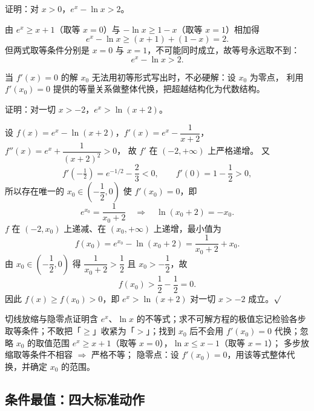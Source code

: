 \begin{explore}
\begin{example}
证明：对 $x>0$，$e^x-\ln x>2$。
\end{example}
\begin{solution}
由 $e^x\ge x+1$（取等 $x=0$）与 $-\ln x\ge1-x$（取等 $x=1$）相加得
\[
  e^x-\ln x\ge (x+1)+(1-x)=2 .
\]
但两式取等条件分别是 $x=0$ 与 $x=1$，不可能同时成立，故等号永远取不到：
\[
  e^x-\ln x>2 .
\]
\end{solution}

当 $f'(x)=0$ 的解 $x_0$ 无法用初等形式写出时，不必硬解：设 $x_0$ 为零点，
利用 $f'(x_0)=0$ 提供的等量关系做整体代换，把超越结构化为代数结构。

\begin{example}
证明：对一切 $x>-2$，$e^x>\ln(x+2)$。
\end{example}
\begin{solution}
设 $f(x)=e^x-\ln(x+2)$，$f'(x)=e^x-\dfrac1{x+2}$，$f''(x)=e^x+\dfrac1{(x+2)^2}>0$，
故 $f'$ 在 $(-2,+\infty)$ 上严格递增。
又
\[
  f'\!\left(-\tfrac12\right)=e^{-1/2}-\frac23<0,\qquad f'(0)=1-\frac12>0,
\]
所以存在唯一的 $x_0\in\left(-\dfrac12,0\right)$ 使 $f'(x_0)=0$，即
\[
  e^{x_0}=\frac1{x_0+2}\quad\Longrightarrow\quad \ln(x_0+2)=-x_0 .
\]
$f$ 在 $(-2,x_0)$ 上递减、在 $(x_0,+\infty)$ 上递增，最小值为
\[
  f(x_0)=e^{x_0}-\ln(x_0+2)=\frac1{x_0+2}+x_0 .
\]
由 $x_0\in\left(-\dfrac12,0\right)$ 得 $\dfrac1{x_0+2}>\dfrac12$ 且 $x_0>-\dfrac12$，故
\[
  f(x_0)>\frac12-\frac12=0 .
\]
因此 $f(x)\ge f(x_0)>0$，即 $e^x>\ln(x+2)$ 对一切 $x>-2$ 成立。$\surd$
\end{solution}

\begin{conccard}[一级]{切线放缩与隐零点}{证明含 $e^x$、$\ln x$ 的不等式；求不可解方程的极值}{忘记检验各步取等条件；不敢把「$\ge$」收紧为「$>$」；找到 $x_0$ 后不会用 $f'(x_0)=0$ 代换；忽略 $x_0$ 的取值范围}
$e^x\ge x+1$（取等 $x=0$），$\ln x\le x-1$（取等 $x=1$）；
多步放缩取等条件不相容 $\Rightarrow$ 严格不等；
隐零点：设 $f'(x_0)=0$，用该等式整体代换，并确定 $x_0$ 的范围。
\end{conccard}

\subsection{条件最值：四大标准动作}



\end{explore}
